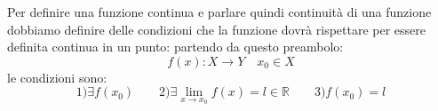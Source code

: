 


Per definire una funzione continua e parlare quindi continuità di una funzione dobbiamo
definire delle condizioni che la funzione dovrà rispettare per essere definita continua in un punto: partendo da questo preambolo:
    \begin{equation}
        f(x):X \to Y \quad x_0 \in X
    \end{equation}
le condizioni sono:
    \begin{equation}
        \text{1)} \exists f(x_0) \qquad \text{2)} \exists \lim_{x \to x_0} f(x)=l \in \mathbb{R} \qquad \text{3)} f(x_0)=l
    \end{equation}
    
